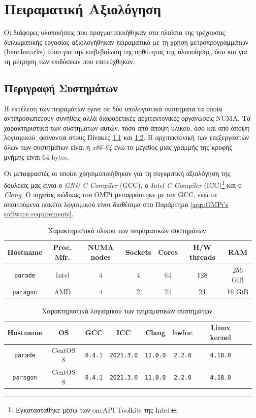 \chapter{Πειραματική Αξιολόγηση}
\label{ch:Experimental Evaluation}
Οι διάφορες υλοποιήσεις που πραγματοποιήθηκαν στα πλαίσια της τρέχουσας διπλωματικής εργασίας αξιολογήθηκαν πειραματικά με τη χρήση μετροπρογραμμάτων (benchmarks) τόσο για την επιβεβαίωση της ορθότητας της υλοποίησης, όσο και για τη μέτρηση των επιδόσεων που επιτεύχθηκαν.


\section{Περιγραφή Συστημάτων}
\label{sec:Systems Description}
Η εκτέλεση των πειραμάτων έγινε σε δύο υπολογιστικά συστήματα τα οποία αντιπροσωπεύουν συνήθεις αλλά διαφορετικές αρχιτεκτονικές οργανώσεις NUMA. Τα χαρακτηριστικά των συστημάτων αυτών, τόσο από άποψη υλικού, όσο και από άποψη λογισμικού, φαίνονται στους Πίνακες \ref{tab:exp-systems-hardware} και \ref{tab:exp-systems-software}. Η αρχιτεκτονική των επεξεργαστών όλων των συστημάτων είναι η \textit{x86-64} ενώ το μέγεθος μιας γραμμής της κρυφής μνήμης είναι 64 bytes.

Οι μεταφραστές οι οποίοι χρησιμοποιήθηκαν για τη συγκριτική αξιολόγηση της δουλειάς μας είναι ο \textit{GNU C Compiler} (GCC), ο \textit{Intel C Compiler} (ICC)\footnote{Εγκαταστάθηκε μέσω των oneAPI Toolkits της Intel\textsuperscript{\textregistered}.} και ο \textit{Clang}. Ο πηγαίος κώδικας του OMPi μεταφράστηκε με τον GCC, ενώ τα απαιτούμενα πακέτα λογισμικού είναι διαθέσιμα στο Παράρτημα \ref{app:OMPi's software requirements}.

\begin{table}
	\centering
		\begin{tabular}{|c||c|c|c|c|c|c|}
		\hline
		Hostname & Proc. Mfr. & NUMA nodes & Sockets & Cores & H/W threads & RAM \\
		\hline \hline
		\texttt{parade} & Intel & 4 & 4 & 64 & 128 & 256 GiB \\
		\hline
		\texttt{paragon} & AMD  & 4 & 2 & 24 & 24 & 16 GiB \\
		\hline
		\end{tabular}
		\caption{Χαρακτηριστικά υλικού των πειραματικών συστημάτων.}
		\label{tab:exp-systems-hardware}
\end{table}

\begin{table}
	\centering
		\begin{tabular}{|c||c|c|c|c|c|c|c|}
		\hline
		Hostname & OS & GCC & ICC & Clang & hwloc & Linux kernel \\
		\hline \hline
		\texttt{parade} & CentOS 8 & \texttt{8.4.1} & \texttt{2021.3.0} & \texttt{11.0.0} & \texttt{2.2.0} & \texttt{4.18.0} \\
		\hline
		\texttt{paragon} & CentOS 8 & \texttt{8.4.1} & \texttt{2021.3.0} & \texttt{11.0.0} & \texttt{2.2.0} & \texttt{4.18.0} \\
		\hline
		\end{tabular}
		\caption{Χαρακτηριστικά λογισμικού των πειραματικών συστημάτων.}
		\label{tab:exp-systems-software}
\end{table}


